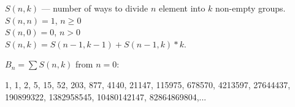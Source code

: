 $S(n, k)$ --- number of ways to divide $n$ element into $k$ non-empty groups.\\

$S(n, n) = 1$, $n \ge 0$\\
$S(n, 0) = 0$, $n > 0$\\

$S(n, k) = S(n - 1, k - 1) + S(n - 1, k) * k$.


$B_n = \sum S(n, k)$ from $n = 0$:

1, 1, 2, 5, 15, 52, 203, 877, 4140, 21147, 115975, 678570, 4213597, 27644437, 190899322, 1382958545, 10480142147, 82864869804,...






\
